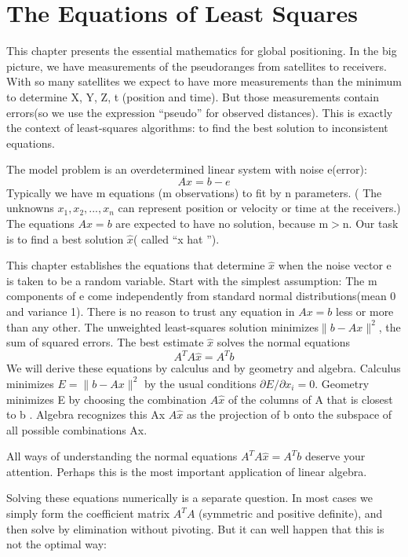 \section{The Equations of Least Squares}
This chapter presents the essential mathematics for global positioning. In the big picture,
we have measurements of the pseudoranges from satellites to receivers. With so many
satellites we expect to have more measurements than the minimum to determine X, Y, Z, t
(position and time). But those measurements contain errors(so we use the expression
“pseudo” for observed distances). This is exactly the context of least-squares algorithms:
to find the best solution to inconsistent equations.

The model problem is an overdetermined linear system with noise e(error): 
\begin{equation}\label{eq:4.1}
Ax=b-e
\end{equation}
Typically we have m equations (m observations) to fit by n parameters. ( The unknowns
$x_1,x_2,...,x_n$ can represent position or velocity or time at the receivers.) The equations
$Ax=b$ are expected to have no solution, because m$>$n. Our task is to find a best
solution $\hat{x}$( called “x hat ”).

This chapter establishes the equations that determine $\hat{x}$ when the noise vector e is
taken to be a random variable. Start with the simplest assumption: The m components of e
come independently from standard normal distributions(mean 0 and variance 1). There is
no reason to trust any equation in $Ax=b$ less or more than any other. The unweighted
least-squares solution minimizes$\| b-Ax \|^2$, the sum of squared errors. The best estimate $\hat{x}$ solves the normal equations
\begin{equation}\label{eq:4.2}
A^TA\hat{x}=A^Tb
\end{equation}
We will derive these equations by calculus and by geometry and algebra. Calculus minimizes $E=\|b-Ax\|^2$ by the usual conditions $\partial E/\partial x_i=0$. Geometry minimizes E by
choosing the combination $A\hat{x}$ of the columns of A that is closest to b . Algebra recognizes
this Ax $A\hat{x}$ as the projection of b onto the subspace of all possible combinations Ax.

All ways of understanding the normal equations $A^TA\hat{x}=A^Tb$ deserve your attention. Perhaps this is the most important application of linear algebra.

Solving these equations numerically is a separate question. In most cases we simply form the coefficient matrix $A^TA$ (symmetric and positive definite), and then solve by
elimination without pivoting. But it can well happen that this is not the optimal way:

